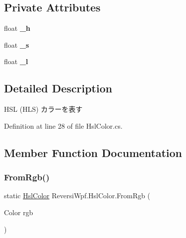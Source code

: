 \subsection*{Private Attributes}
\begin{DoxyCompactItemize}
\item 
\mbox{\label{class_reversi_wpf_1_1_hsl_color_a0ab31c8cfeea24ffb4a8a5dfcc7dd817}} 
float {\bfseries \+\_\+h}
\item 
\mbox{\label{class_reversi_wpf_1_1_hsl_color_a421d055ca374af31bc7153f0103bba72}} 
float {\bfseries \+\_\+s}
\item 
\mbox{\label{class_reversi_wpf_1_1_hsl_color_ad8e0aa4c03ad37fdff47d2808c70a184}} 
float {\bfseries \+\_\+l}
\end{DoxyCompactItemize}


\subsection{Detailed Description}
H\+SL (H\+LS) カラーを表す 

Definition at line 28 of file Hsl\+Color.\+cs.



\subsection{Member Function Documentation}
\mbox{\label{class_reversi_wpf_1_1_hsl_color_a0725f254d6e13cd9e7114fe8b1645954}} 
\subsubsection{\texorpdfstring{From\+Rgb()}{FromRgb()}}
{\footnotesize\ttfamily static \hyperlink{class_reversi_wpf_1_1_hsl_color}{Hsl\+Color} Reversi\+Wpf.\+Hsl\+Color.\+From\+Rgb (\begin{DoxyParamCaption}\item[{Color}]{rgb }\end{DoxyParamCaption})\hspace{0.3cm}{\ttfamily [static]}}



